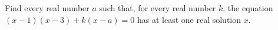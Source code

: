 Find every real number $a$ such that, for every real number $k$, the equation $(x-1)(x-3)+k(x-a)=0$ has at least one real solution $x$.
